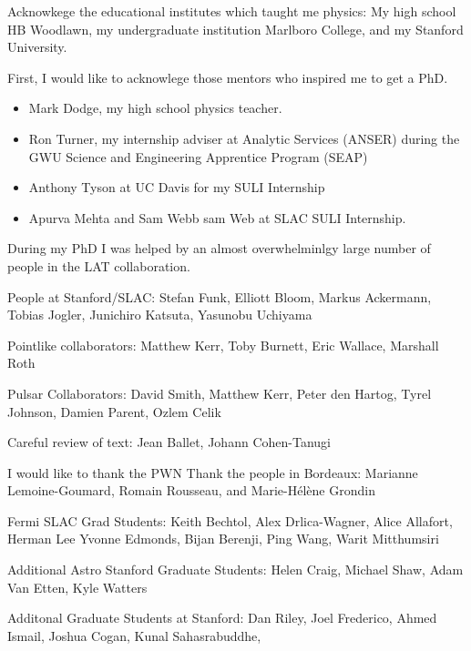 

Acknowkege the educational institutes which taught me physics: My high school HB Woodlawn,
my undergraduate institution Marlboro College, and my Stanford University.

First, I would like to acknowlege those mentors who inspired me to get a PhD.
\begin{itemize}
  \item Mark Dodge, my high school physics teacher.
  \item Ron Turner, my internship adviser at Analytic Services (ANSER) during the 
  GWU Science and Engineering Apprentice Program (SEAP)
  \item Anthony Tyson at UC Davis for my SULI Internship
  \item Apurva Mehta and Sam Webb sam Web at SLAC SULI Internship.
\end{itemize}


During my PhD I was helped by an almost overwhelminlgy large 
number of people in the LAT collaboration.

People at Stanford/SLAC: Stefan Funk, Elliott Bloom, 
Markus Ackermann, Tobias Jogler, Junichiro Katsuta, Yasunobu Uchiyama

Pointlike collaborators: Matthew Kerr, Toby Burnett, Eric Wallace, Marshall Roth

Pulsar Collaborators: David Smith, Matthew Kerr, Peter den Hartog, Tyrel Johnson, Damien Parent, Ozlem Celik

Careful review of text: Jean Ballet, Johann Cohen-Tanugi

I would like to thank the PWN
Thank the people in Bordeaux: Marianne Lemoine-Goumard, Romain Rousseau, and Marie-H\'el\`ene Grondin


Fermi SLAC Grad Students: Keith Bechtol, Alex Drlica-Wagner, Alice Allafort, Herman Lee
Yvonne Edmonds, Bijan Berenji, Ping Wang, Warit Mitthumsiri


Additional Astro Stanford Graduate Students: Helen Craig, Michael Shaw, Adam Van Etten, Kyle Watters

Additonal Graduate Students at Stanford: Dan Riley, Joel Frederico, Ahmed Ismail, Joshua Cogan, Kunal Sahasrabuddhe,
